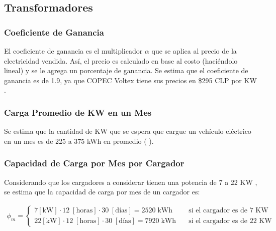 \documentclass[letterpaper]{article}
\begin{document}
\begin{flushleft}
	\subsection{Transformadores}

	\subsubsection{Coeficiente de Ganancia}

	El coeficiente de ganancia es el multiplicador $\alpha$ que se aplica al precio de la electricidad vendida. Así, el precio es calculado en base al costo (haciéndolo lineal) y se le agrega un porcentaje de ganancia. Se estima que el coeficiente de ganancia es de 1.9, ya que COPEC Voltex tiene sus precios en \$295 CLP por KW \cite{copec}.

	\subsubsection{Carga Promedio de KW en un Mes}


	Se estima que la cantidad de KW que se espera que cargue un vehículo eléctrico en un mes es de 225 a 375 kWh en promedio (\cite{delta1} \cite{delta2} \cite{delta3}).

	\subsubsection{Capacidad de Carga por Mes por Cargador}

	Considerando que los cargadores a considerar tienen una potencia de 7 a 22 KW \cite{cargadores}, se estima que la capacidad de carga por mes de un cargador es:

	\begin{align*}
		\phi_m =
		\begin{cases}
			7 [\text{kW}] \cdot 12\; [\text{horas}] \cdot  30 \;[\text{días}] = 2520 \; \text{kWh} & \quad\text{si el cargador es de 7 KW}  \\
			22 [\text{kW}] \cdot 12\; [\text{horas}] \cdot  30 \;[\text{días}] = 7920 \;\text{kWh} & \quad\text{si el cargador es de 22 KW}
		\end{cases}
	\end{align*}


\end{flushleft}
\end{document}
